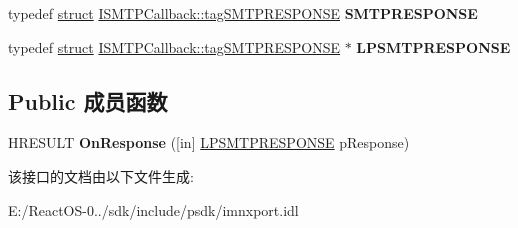 \begin{DoxyCompactItemize}
\mbox{\label{interface_i_s_m_t_p_callback_a8437614e882f24479a0cc69078d88028}} 
typedef \hyperlink{interfacestruct}{struct} \hyperlink{struct_i_s_m_t_p_callback_1_1tag_s_m_t_p_r_e_s_p_o_n_s_e}{I\+S\+M\+T\+P\+Callback\+::tag\+S\+M\+T\+P\+R\+E\+S\+P\+O\+N\+SE} {\bfseries S\+M\+T\+P\+R\+E\+S\+P\+O\+N\+SE}
\item 
\mbox{\label{interface_i_s_m_t_p_callback_ad8f1adcc0be568fab7bbaedc9916efbe}} 
typedef \hyperlink{interfacestruct}{struct} \hyperlink{struct_i_s_m_t_p_callback_1_1tag_s_m_t_p_r_e_s_p_o_n_s_e}{I\+S\+M\+T\+P\+Callback\+::tag\+S\+M\+T\+P\+R\+E\+S\+P\+O\+N\+SE} $\ast$ {\bfseries L\+P\+S\+M\+T\+P\+R\+E\+S\+P\+O\+N\+SE}
\end{DoxyCompactItemize}
\subsection*{Public 成员函数}
\begin{DoxyCompactItemize}
\item 
\mbox{\label{interface_i_s_m_t_p_callback_a700ebf9091bfe1db84f881df2830d2c0}} 
H\+R\+E\+S\+U\+LT {\bfseries On\+Response} (\mbox{[}in\mbox{]} \hyperlink{struct_i_s_m_t_p_callback_1_1tag_s_m_t_p_r_e_s_p_o_n_s_e}{L\+P\+S\+M\+T\+P\+R\+E\+S\+P\+O\+N\+SE} p\+Response)
\end{DoxyCompactItemize}


该接口的文档由以下文件生成\+:\begin{DoxyCompactItemize}
\item 
E\+:/\+React\+O\+S-\/0../sdk/include/psdk/imnxport.\+idl\end{DoxyCompactItemize}
